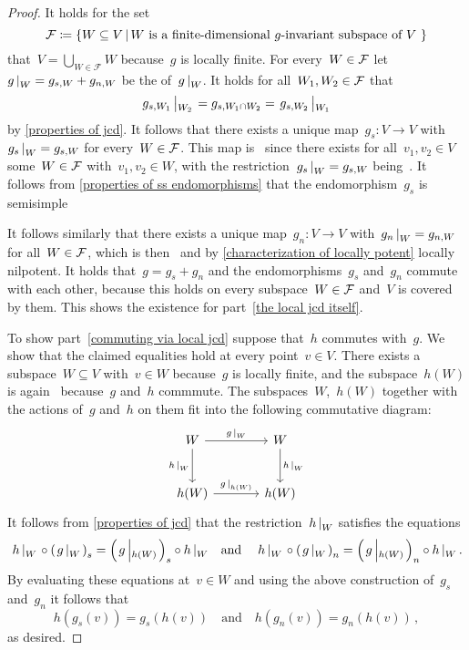 \begin{proof}
  \label{local jcd proof}
  It holds for the set
  \[
              \mc{F}
    \defined  \left\{
                W \subseteq V
              \suchthat*
                \text{$W$ is a \dash{finite}{dimensional}~\dash{$g$}{invariant} subspace of~$V$}\ 
              \right\}
  \]
  that~$V = \bigcup_{W \in \mathcal{F}} W$ because~$g$ is locally finite.
  For every~$W \in \mathcal{F}$ let~$\restrict{g}{W} = g_{s,W} + g_{n,W}$ be the {\JCD} of~$\restrict{g}{W}$.
  It holds for all~$W_1, W_2 \in \mathcal{F}$ that
  \[
      \restrict*{g_{s,W_1}}{W_2}
    = g_{s, W_1 \cap W_2}
    = \restrict*{g_{s,W_2}}{W_1}
  \]
  by \cref{properties of jcd}.
  It follows that there exists a unique map~$g_s \colon V \to V$ with~$\restrict{g_s}{W} = g_{s,W}$ for every~$W \in \mathcal{F}$.
  This map is~ since there exists for all~$v_1, v_2 \in V$ some~$W \in \mathcal{F}$ with~$v_1, v_2 \in W$, with the restriction~$\restrict{g_s}{W} = g_{s,W}$ being~\dash{$k$}{linear}.
  It follows from \cref{properties of ss endomorphisms} that the endomorphism~$g_s$ is semisimple
  
  It follows similarly that there exists a unique map~$g_n \colon V \to V$ with~$\restrict{g_n}{W} = g_{n,W}$ for all~$W \in \mathcal{F}$, which is then~ and by \cref{characterization of locally potent} locally nilpotent.
  It holds that~$g = g_s + g_n$ and the endomorphisms~$g_s$ and~$g_n$ commute with each other, because this holds on every subspace~$W \in \mathcal{F}$ and~$V$ is covered by them.
  This shows the existence for part~\ref*{the local jcd itself}.
  
  To show part~\ref*{commuting via local jcd} suppose that~$h$ commutes with~$g$.
  We show that the claimed equalities hold at every point~$v \in V$.
  There exists a \dash{finite}{dimensional}~ subspace~$W \subseteq V$ with~$v \in W$ because~$g$ is locally finite, and the subspace~$h(W)$ is again~\dash{$g$}{invariant} because~$g$ and~$h$ commmute.
  The subspaces~$W$,~$h(W)$ together with the actions of~$g$ and~$h$ on them fit into the following commutative diagram:
  \[
    \begin{tikzcd}[sep = large]
        W
        \arrow{r}[above]{\restrict{g}{W}}
        \arrow{d}[left]{\restrict{h}{W}}
      & W
        \arrow{d}[right]{\restrict{h}{W}}
      \\
        h(W)
        \arrow{r}[above]{\restrict{g}{h(W)}}
      & h(W)
    \end{tikzcd}
  \]
  It follows from \cref{properties of jcd} that the restriction~$\restrict{h}{W}$ satisfies the equations
  \[
      \restrict*{h}{W} \circ \left( \restrict*{g}{W} \right)_s
    = \left( \restrict*{g}{h(W)} \right)_s \circ \restrict{h}{W}
    \quad\text{and}\quad
      \restrict*{h}{W} \circ \left( \restrict*{g}{W} \right)_n
    = \left( \restrict*{g}{h(W)} \right)_n \circ \restrict{h}{W} \,.
  \]
  By evaluating these equations at~$v \in W$ and using the above construction of~$g_s$ and~$g_n$ it follows that
  \[
      h(g_s(v))
    = g_s(h(v))
    \quad\text{and}\quad
      h(g_n(v))
    = g_n(h(v)) \,,
  \]
  as desired.


\end{proof}
